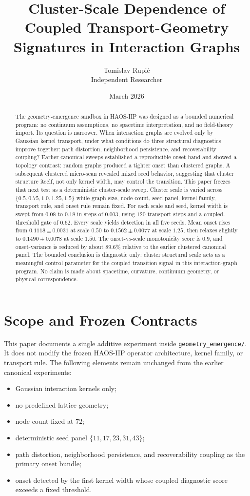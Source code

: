 \documentclass[11pt]{article}
\title{Cluster-Scale Dependence of Coupled Transport-Geometry Signatures in Interaction Graphs}
\author{Tomislav Rupi\'c \\ Independent Researcher}
\date{March 2026}
\begin{document}
\maketitle

\begin{abstract}
The geometry-emergence sandbox in HAOS-IIP was designed as a bounded numerical program: no continuum assumptions, no spacetime interpretation, and no field-theory import. Its question is narrower. When interaction graphs are evolved only by Gaussian kernel transport, under what conditions do three structural diagnostics improve together: path distortion, neighborhood persistence, and recoverability coupling? Earlier canonical sweeps established a reproducible onset band and showed a topology contrast: random graphs produced a tighter onset than clustered graphs. A subsequent clustered micro-scan revealed mixed seed behavior, suggesting that cluster structure itself, not only kernel width, may control the transition. This paper freezes that next test as a deterministic cluster-scale sweep. Cluster scale is varied across $\{0.5,0.75,1.0,1.25,1.5\}$ while graph size, node count, seed panel, kernel family, transport rule, and onset rule remain fixed. For each scale and seed, kernel width is swept from $0.08$ to $0.18$ in steps of $0.003$, using $120$ transport steps and a coupled-threshold gate of $0.62$. Every scale yields detection in all five seeds. Mean onset rises from $0.1118 \pm 0.0031$ at scale $0.50$ to $0.1562 \pm 0.0077$ at scale $1.25$, then relaxes slightly to $0.1490 \pm 0.0078$ at scale $1.50$. The onset-vs-scale monotonicity score is $0.9$, and onset-variance is reduced by about $89.6\%$ relative to the earlier clustered canonical panel. The bounded conclusion is diagnostic only: cluster structural scale acts as a meaningful control parameter for the coupled transition signal in this interaction-graph program. No claim is made about spacetime, curvature, continuum geometry, or physical correspondence.
\end{abstract}

\section{Scope and Frozen Contracts}

This paper documents a single additive experiment inside \texttt{geometry\_emergence/}. It does not modify the frozen HAOS-IIP operator architecture, kernel family, or transport rule. The following elements remain unchanged from the earlier canonical experiments:
\begin{itemize}
\item Gaussian interaction kernels only;
\item no predefined lattice geometry;
\item node count fixed at $72$;
\item deterministic seed panel $\{11,17,23,31,43\}$;
\item path distortion, neighborhood persistence, and recoverability coupling as the primary onset bundle;
\item onset detected by the first kernel width whose coupled diagnostic score exceeds a fixed threshold.
\end{itemize}
\end{document}
